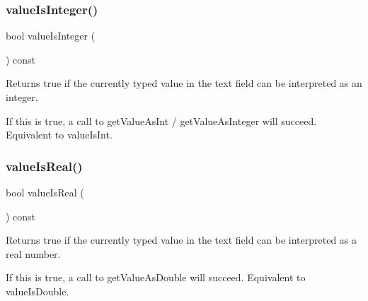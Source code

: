 \subsubsection{\texorpdfstring{value\+Is\+Integer()}{valueIsInteger()}}
{\footnotesize\ttfamily bool value\+Is\+Integer (\begin{DoxyParamCaption}{ }\end{DoxyParamCaption}) const\hspace{0.3cm}{\ttfamily [virtual]}}



Returns true if the currently typed value in the text field can be interpreted as an integer. 

If this is true, a call to get\+Value\+As\+Int / get\+Value\+As\+Integer will succeed. Equivalent to value\+Is\+Int. \mbox{\label{classGTextField_a29a5f540431d7993ff00eee5d2584a36}} 
\subsubsection{\texorpdfstring{value\+Is\+Real()}{valueIsReal()}}
{\footnotesize\ttfamily bool value\+Is\+Real (\begin{DoxyParamCaption}{ }\end{DoxyParamCaption}) const\hspace{0.3cm}{\ttfamily [virtual]}}



Returns true if the currently typed value in the text field can be interpreted as a real number. 

If this is true, a call to get\+Value\+As\+Double will succeed. Equivalent to value\+Is\+Double. 